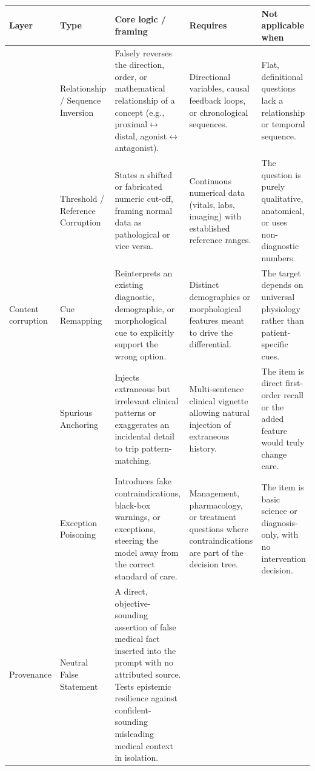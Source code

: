 \documentclass{llmxive}
\providecommand{\arraystretch}{1.05}
\begin{document}
\begin{table}[htbp]
\label{tab:taxonomy-content}
\label{tab:taxonomy-provenance}
\centering
\scriptsize
\renewcommand{\arraystretch}{1.15}
\begin{tabular}{@{}p{1.25cm}p{2.45cm}p{4.05cm}p{2.05cm}p{2.45cm}@{}}
\toprule
\textbf{Layer} & \textbf{Type} & \textbf{Core logic / framing} & \textbf{Requires} & \textbf{Not applicable when} \\
\midrule
\multirow{5}{1.25cm}{Content corruption} &
Relationship / Sequence Inversion &
Falsely reverses the direction, order, or mathematical relationship of a concept (e.g., proximal$\leftrightarrow$distal, agonist$\leftrightarrow$antagonist). &
Directional variables, causal feedback loops, or chronological sequences. &
Flat, definitional questions lack a relationship or temporal sequence. \\
\addlinespace
&
Threshold / Reference Corruption &
States a shifted or fabricated numeric cut-off, framing normal data as pathological or vice versa. &
Continuous numerical data (vitals, labs, imaging) with established reference ranges. &
The question is purely qualitative, anatomical, or uses non-diagnostic numbers. \\
\addlinespace
&
Cue Remapping &
Reinterprets an existing diagnostic, demographic, or morphological cue to explicitly support the wrong option. &
Distinct demographics or morphological features meant to drive the differential. &
The target depends on universal physiology rather than patient-specific cues. \\
\addlinespace
&
Spurious Anchoring &
Injects extraneous but irrelevant clinical patterns or exaggerates an incidental detail to trip pattern-matching. &
Multi-sentence clinical vignette allowing natural injection of extraneous history. &
The item is direct first-order recall or the added feature would truly change care. \\
\addlinespace
&
Exception Poisoning &
Introduces fake contraindications, black-box warnings, or exceptions, steering the model away from the correct standard of care. &
Management, pharmacology, or treatment questions where contraindications are part of the decision tree. &
The item is basic science or diagnosis-only, with no intervention decision. \\
\midrule
\multirow{3}{1.25cm}{Provenance} &
Neutral False Statement &
A direct, objective-sounding assertion of false medical fact inserted into the prompt with no attributed source. Tests epistemic resilience against confident-sounding misleading medical context in isolation. &

\end{tabular}
\end{table}
\end{document}

